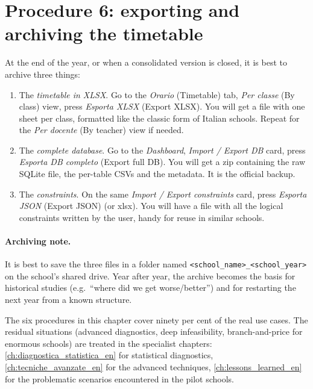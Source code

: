 
\section{Procedure 6: exporting and archiving the timetable}
\label{sec:wf_export}

At the end of the year, or when a consolidated version is closed,
it is best to archive three things:

\begin{enumerate}
\item The \emph{timetable in XLSX}. Go to the \emph{Orario}
  (Timetable) tab, \emph{Per classe} (By class) view, press
  \emph{Esporta XLSX} (Export XLSX). You will get a file with one
  sheet per class, formatted like the classic form of Italian
  schools. Repeat for the \emph{Per docente} (By teacher) view if
  needed.
\item The \emph{complete database}. Go to the \emph{Dashboard},
  \emph{Import / Export DB} card, press \emph{Esporta DB completo}
  (Export full DB). You will get a zip containing the raw SQLite
  file, the per-table CSVs and the metadata. It is the official
  backup.
\item The \emph{constraints}. On the same \emph{Import / Export
  constraints} card, press \emph{Esporta JSON} (Export JSON) (or
  xlsx). You will have a file with all the logical constraints
  written by the user, handy for reuse in similar schools.
\end{enumerate}

\paragraph{Archiving note.} It is best to save the three files in
a folder named \texttt{<school\_name>\_<school\_year>} on the
school's shared drive. Year after year, the archive becomes the
basis for historical studies (e.g.\ ``where did we get
worse/better'') and for restarting the next year from a known
structure.

\fleuron

\begin{biblioparvabox}
The six procedures in this chapter cover ninety per cent of the
real use cases. The residual situations (advanced diagnostics,
deep infeasibility, branch-and-price for enormous schools) are
treated in the specialist chapters:
\cref{ch:diagnostica_statistica_en} for statistical diagnostics,
\cref{ch:tecniche_avanzate_en} for the advanced techniques,
\cref{ch:lessons_learned_en} for the problematic scenarios
encountered in the pilot schools.
\end{biblioparvabox}
